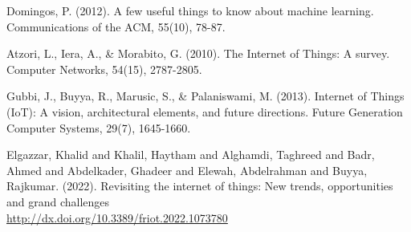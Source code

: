 \begin{thebibliography}{00}
Domingos, P. (2012). A few useful things to know about machine learning. Communications of the ACM, 55(10), 78-87.

Atzori, L., Iera, A., & Morabito, G. (2010). The Internet of Things: A survey. Computer Networks, 54(15), 2787-2805.

Gubbi, J., Buyya, R., Marusic, S., & Palaniswami, M. (2013). Internet of Things (IoT): A vision, architectural elements, and future directions. Future Generation Computer Systems, 29(7), 1645-1660.

Elgazzar, Khalid and Khalil, Haytham and Alghamdi, Taghreed and Badr, Ahmed and Abdelkader, Ghadeer and Elewah, Abdelrahman and Buyya, Rajkumar. (2022). Revisiting the internet of things: New trends, opportunities and grand challenges\\
\url{http://dx.doi.org/10.3389/friot.2022.1073780}


\end{thebibliography}